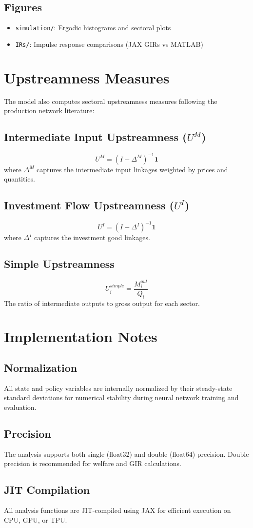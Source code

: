 \documentclass[11pt]{article}
\begin{document}
\subsection{Figures}
\begin{itemize}
    \item \texttt{simulation/}: Ergodic histograms and sectoral plots
    \item \texttt{IRs/}: Impulse response comparisons (JAX GIRs vs MATLAB)
\end{itemize}

\section{Upstreamness Measures}

The model also computes sectoral upstreamness measures following the production network literature:

\subsection{Intermediate Input Upstreamness ($U^M$)}
\begin{equation}
    U^M = (I - \Delta^M)^{-1} \mathbf{1}
\end{equation}
where $\Delta^M$ captures the intermediate input linkages weighted by prices and quantities.

\subsection{Investment Flow Upstreamness ($U^I$)}
\begin{equation}
    U^I = (I - \Delta^I)^{-1} \mathbf{1}
\end{equation}
where $\Delta^I$ captures the investment good linkages.

\subsection{Simple Upstreamness}
\begin{equation}
    U^{simple}_i = \frac{M^{out}_i}{Q_i}
\end{equation}
The ratio of intermediate outputs to gross output for each sector.

\section{Implementation Notes}

\subsection{Normalization}
All state and policy variables are internally normalized by their steady-state standard deviations for numerical stability during neural network training and evaluation.

\subsection{Precision}
The analysis supports both single (float32) and double (float64) precision. Double precision is recommended for welfare and GIR calculations.

\subsection{JIT Compilation}
All analysis functions are JIT-compiled using JAX for efficient execution on CPU, GPU, or TPU.
\end{document}
